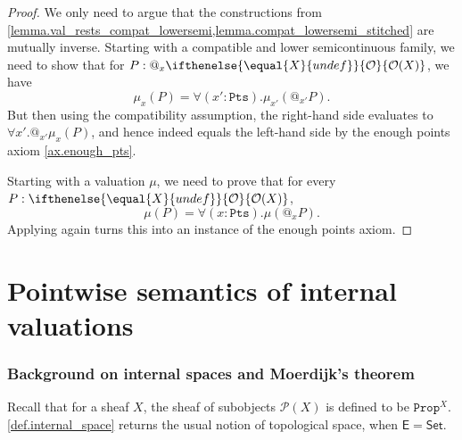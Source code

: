 \documentclass[reqno,11pt]{amsproc}
\makeatletter
\theoremstyle{plain}
\theoremstyle{definition}
\newcommand{\Const}[1]{\mathtt{#1}}
\newcommand{\cat}[1]{\mathsf{#1}}
\newcommand{\Set}{\cat{Set}}
\newcommand{\pow}{\mathcal{P}}
\newcommand{\prop}{\Const{Prop}}
\newcommand{\pt}{x}
\newcommand{\Op}[1][undef]{\ifthenelse{\equal{#1}{undef}}{\mathcal{O}}{\mathcal{O}(#1)}}
\newcommand{\pts}{\mathtt{Pts}}		%
\newcommand{\atsymbol}{{@}}
\newcommand{\at}[1][\pt]{\atsymbol_{#1}}
\numberwithin{equation}{section}
\makeatother
\begin{document}
\begin{proof}
	We only need to argue that the constructions from \cref{lemma.val_rests_compat_lowersemi,lemma.compat_lowersemi_stitched} are mutually inverse. Starting with a compatible and lower semicontinuous family, we need to show that for $P : \at \Op[X]$, we have
	\[
		\mu_\pt(P) = \forall (\pt' : \pts) . \mu_{\pt'}( \at[\pt'] P).
	\]
	But then using the compatibility assumption, the right-hand side evaluates to $\forall \pt' . \at[\pt'] \mu_\pt(P)$, and hence indeed equals the left-hand side by the enough points axiom \ref{ax.enough_pts}.

	Starting with a valuation $\mu$, we need to prove that for every $P : \Op[X]$,
	\[
		\mu(P) = \forall (\pt : \pts) . \mu(\at P).
	\]
	Applying  again turns this into an instance of the enough points axiom.
\end{proof}

\newpage
\part{Pointwise semantics of internal valuations}

\section{Background on internal spaces and Moerdijk's theorem}

Recall that for a sheaf $X$, the sheaf of subobjects $\pow(X)$ is defined to be $\prop^X$. \cref{def.internal_space} returns the usual notion of topological space, when $\cat{E}=\Set$.
\end{document}

